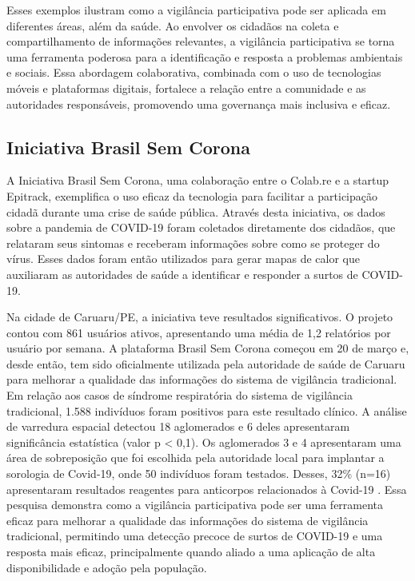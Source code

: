 Esses exemplos ilustram como a vigilância participativa pode ser aplicada em diferentes áreas, além da saúde. Ao envolver os cidadãos na coleta e compartilhamento de informações relevantes, a vigilância participativa se torna uma ferramenta poderosa para a identificação e resposta a problemas ambientais e sociais. Essa abordagem colaborativa, combinada com o uso de tecnologias móveis e plataformas digitais, fortalece a relação entre a comunidade e as autoridades responsáveis, promovendo uma governança mais inclusiva e eficaz.

\subsection*{Iniciativa Brasil Sem Corona}

A Iniciativa Brasil Sem Corona, uma colaboração entre o Colab.re e a startup Epitrack, exemplifica o uso eficaz da tecnologia para facilitar a participação cidadã durante uma crise de saúde pública. Através desta iniciativa, os dados sobre a pandemia de COVID-19 foram coletados diretamente dos cidadãos, que relataram seus sintomas e receberam informações sobre como se proteger do vírus. Esses dados foram então utilizados para gerar mapas de calor que auxiliaram as autoridades de saúde a identificar e responder a surtos de COVID-19.

Na cidade de Caruaru/PE, a iniciativa teve resultados significativos. O projeto contou com 861 usuários ativos, apresentando uma média de 1,2 relatórios por usuário por semana. A plataforma Brasil Sem Corona começou em 20 de março e, desde então, tem sido oficialmente utilizada pela autoridade de saúde de Caruaru para melhorar a qualidade das informações do sistema de vigilância tradicional. Em relação aos casos de síndrome respiratória do sistema de vigilância tradicional, 1.588 indivíduos foram positivos para este resultado clínico. A análise de varredura espacial detectou 18 aglomerados e 6 deles apresentaram significância estatística (valor p < 0,1). Os aglomerados 3 e 4 apresentaram uma área de sobreposição que foi escolhida pela autoridade local para implantar a sorologia de Covid-19, onde 50 indivíduos foram testados. Desses, 32\% (n=16) apresentaram resultados reagentes para anticorpos relacionados à Covid-19 \cite[1]{2020_LealNeto}. Essa pesquisa demonstra como a vigilância participativa pode ser uma ferramenta eficaz para melhorar a qualidade das informações do sistema de vigilância tradicional, permitindo uma detecção precoce de surtos de COVID-19 e uma resposta mais eficaz, principalmente quando aliado a uma aplicação de alta disponibilidade e adoção pela população.


